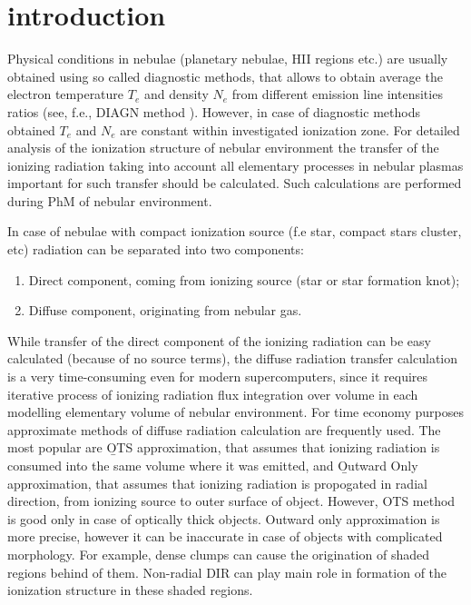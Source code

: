 \documentclass[a4paper]{article}
\begin{document}
\section*{\sc introduction}
\indent \indent Physical conditions in nebulae (planetary nebulae, HII regions etc.)
are usually obtained using so called diagnostic methods, that allows to obtain average
the electron temperature $T_e$ and density $N_e$ from different emission line intensities ratios 
(see, f.e., DIAGN method \cite{DIAGN}). However, in case of diagnostic methods 
obtained $T_e$ and $N_e$ are constant within investigated ionization zone. 
For detailed analysis of the ionization structure of nebular environment 
the transfer of the ionizing radiation taking into account all elementary processes
in nebular plasmas important for such transfer should be calculated.
Such calculations are performed during PhM of nebular environment.

In case of nebulae with compact ionization source (f.e star, compact stars cluster, etc) 
radiation can be separated into two components:
\begin{enumerate}
\item Direct component, coming from ionizing source (star or star formation knot);
\item Diffuse component, originating from nebular gas.
\end{enumerate}

While transfer of the direct component of the ionizing radiation can be easy calculated
(because of no source terms), the diffuse radiation transfer calculation 
is a very time-consuming even for modern supercomputers,
since it requires iterative process of ionizing radiation flux integration over volume 
in each modelling elementary volume of nebular environment.
For time economy purposes approximate methods
of diffuse radiation calculation are frequently used.
The most popular are {\b OTS} approximation,
that assumes that ionizing radiation is consumed into the same volume where it was emitted,
and {\b Outward Only} approximation, that assumes that ionizing radiation is propogated 
in radial direction, from ionizing source to outer surface of object.
However, OTS method
is good only in case of optically thick objects. Outward only approximation is more precise, 
however it can be inaccurate in case of objects with complicated morphology.
For example, dense clumps can cause the origination of shaded regions behind of them.
Non-radial DIR can play main role in formation of the ionization structure in these shaded
regions.
\end{document}
